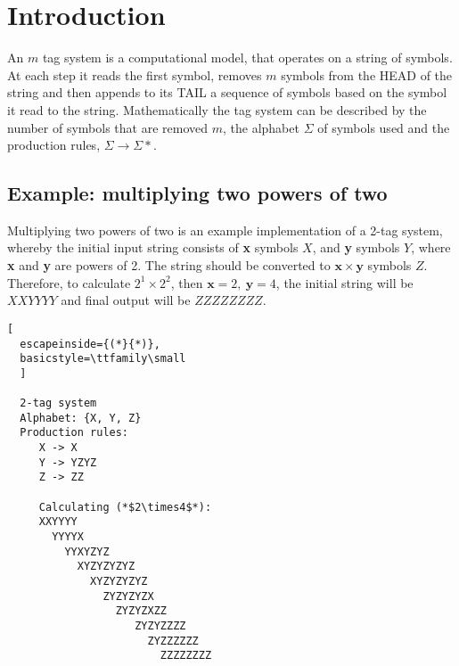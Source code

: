 \documentclass[
11pt, %
a4paper, %
oneside, %
headinclude,footinclude, %
BCOR5mm, %
]{scrartcl}
\begin{document}




\newpage %


\section{Introduction}
An $m$ tag system is a computational model, that operates on a string of symbols.
At each step it reads the first symbol, removes $m$ symbols from the HEAD of the
string and then appends to its TAIL a sequence of symbols based on the symbol it read to the
string. Mathematically the tag system can be described by the number of symbols
that are removed $m$, the alphabet $\Sigma$ of symbols used and the production
rules, $\Sigma \to \Sigma*$.

\subsection{Example: multiplying two powers of two}
Multiplying two powers of two is an example implementation of a 2-tag system, whereby the initial input string consists of \textbf{x} symbols $X$, and \textbf{y} symbols $Y$, where \textbf{x} and \textbf{y} are powers of 2. The string should be converted to $\mathbf{x}\times \mathbf{y}$ symbols $Z$. Therefore, to calculate $2^1\times2^2$, then $\mathbf{x}=2,\ \mathbf{y}=4$, the initial string will be $XXYYYY$ and final output will be $ZZZZZZZZ$.

\begin{lstlisting}[
  escapeinside={(*}{*)},
  basicstyle=\ttfamily\small
  ]
  
  2-tag system
  Alphabet: {X, Y, Z}
  Production rules:
     X -> X
     Y -> YZYZ
     Z -> ZZ

     Calculating (*$2\times4$*):
     XXYYYY
       YYYYX
         YYXYZYZ
           XYZYZYZYZ
             XYZYZYZYZ
               ZYZYZYZX
                 ZYZYZXZZ
                    ZYZYZZZZ
                      ZYZZZZZZ
                        ZZZZZZZZ
   
\end{lstlisting}
\end{document}
